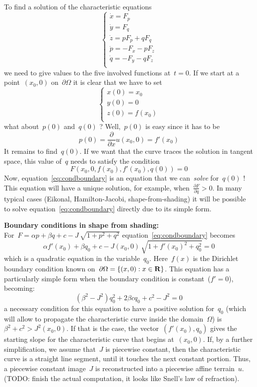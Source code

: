To find a solution of the characteristic equations
\begin{equation*}
	\begin{cases}
		\dot x = F_p \\
		\dot y = F_q \\
		\dot z = pF_p + qF_q \\
		\dot p = -F_x - pF_z \\
		\dot q = -F_y - qF_z \\
	\end{cases}
\end{equation*}
we need to give values to the five involved functions at~$t=0$.
If we start at a point~$(x_0,0)$ on~$\partial\Omega$ it is clear that
we have to set
\begin{equation*}
	\begin{cases}
		x(0) = x_0 \\
		y(0) = 0 \\
		z(0) = f(x_0) \\
	\end{cases}
\end{equation*}
what about~$p(0)$ and~$q(0)$ ?
Well,~$p(0)$ is easy since it has to be
\[
	p(0) = \frac{\partial}{\partial x}u(x_0,0) = f'(x_0)
\]
It remains to find~$q(0)$.  If we want that the curve traces the solution in
tangent space, this value of~$q$ needs to satisfy the condition
\begin{equation}\label{eq:condboundary}
	F(x_0, 0, f(x_0), f'(x_0), q(0)) = 0
\end{equation}
Now, equation~\eqref{eq:condboundary} is an equation that we can~\emph{solve}
for~$q(0)$ !
This equation will have a unique solution, for example, when~$\frac{\partial
F}{\partial q}>0$.  In many typical cases (Eikonal, Hamilton-Jacobi,
shape-from-shading) it will be possible to solve
equation~\eqref{eq:condboundary} directly due to its simple form.

{\bf Boundary conditions in shape from shading:}\\
For~$F=\alpha p + \beta q + c - J\,\sqrt{1+p^2+q^2}$
equation~\eqref{eq:condboundary} becomes
\[
	\alpha f'(x_0) + \beta q_0 + c
	-J(x_0,0)\, \sqrt{1+f'(x_0)^2+q_0^2} = 0
\]
which is a quadratic equation in the variable~$q_0$.  Here~$f(x)$ is the
Dirichlet boundary condition known on~$\partial\Omega=\{(x,0):x\in\mathbf{R}\}$.
This equation has a particularly simple form when the boundary condition is
constant~($f'=0$), becoming:
\[
	\left(\beta^2-J^2\right)q_0^2+2\beta cq_0+c^2-J^2=0
\]
a necessary condition for this equation to have a positive solution for~$q_0$
(which will allow to propagate the characteristic curve inside the
domain~$\Omega$) is~$\beta^2+c^2>J^2(x_0,0)$.  If that is the case, the
vector~$(f'(x_0),q_0)$ gives the starting slope for the characteristic curve
that begins at~$(x_0,0)$.  If, by a further simplification, we assume
that~$J$ is piecewise constant, then the characteristic curve is a straight
line segment, until it touches the next constant portion.  Thus, a piecewise
constant image~$J$ is reconstructed into a piecewise affine terrain~$u$.
(TODO: finish the actual computation, it looks like Snell's law of
refraction).



